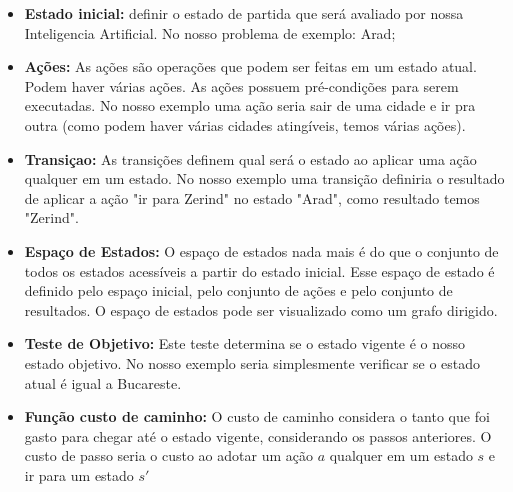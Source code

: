 \begin{itemize}
	\item \textbf{Estado inicial: } definir o estado de partida que será avaliado por nossa Inteligencia Artificial. No nosso problema de exemplo: Arad;
	\item \textbf{Ações: }As ações são operações que podem ser feitas em um estado atual. Podem haver várias ações. As ações possuem pré-condições para serem executadas. No nosso exemplo uma ação seria sair de uma cidade e ir pra outra (como podem haver várias cidades atingíveis, temos várias ações).
	\item \textbf{Transiçao: }As transições definem qual será o estado ao aplicar uma ação qualquer em um estado. No nosso exemplo uma transição definiria o resultado de aplicar a ação "ir para Zerind" no estado "Arad", como resultado temos "Zerind". 
	\item  \textbf{Espaço de Estados: } O espaço de estados nada mais é do que o conjunto de todos os estados acessíveis a partir do estado inicial. Esse espaço de estado é definido pelo espaço inicial, pelo conjunto de ações e pelo conjunto de resultados. O espaço de estados pode ser visualizado como um grafo dirigido.
	\item \textbf{Teste de Objetivo: }Este teste determina se o estado vigente é o nosso estado objetivo. No nosso exemplo seria simplesmente verificar se o estado atual é igual a Bucareste.
	\item \textbf{Função custo de caminho: }O custo de caminho considera o tanto que foi gasto para chegar até o estado vigente, considerando os passos anteriores. O custo de passo seria o custo ao adotar um ação $a$ qualquer em um estado $s$ e ir para um estado $s'$
\end{itemize}



